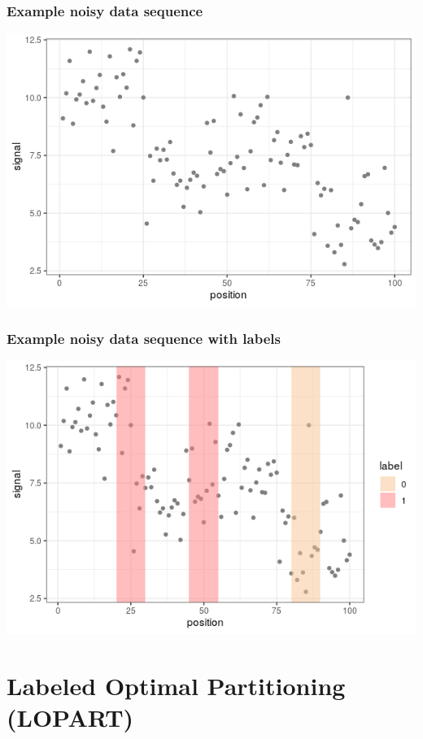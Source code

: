 \documentclass{beamer}
\begin{document}
\begin{frame}
  \frametitle{Example noisy data sequence}

  \includegraphics[width=\textwidth]{figure-baselines-data} 
  
\end{frame}

\begin{frame}
  \frametitle{Example noisy data sequence with labels}

  \includegraphics[width=\textwidth]{figure-baselines-labels}  
  
\end{frame}



\section{Labeled Optimal Partitioning (LOPART)}
\end{document}
